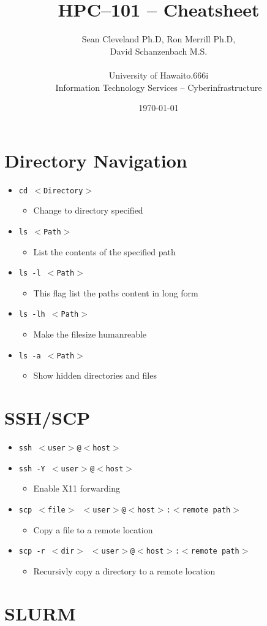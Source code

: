 \documentclass[11pt,twocolumn]{article}
\newcommand{\lft}{$<$}
\newcommand{\rht}{$>$}
\newcommand{\pth}[1]{{\lft}#1{\rht}}
\newlength{\okinalen}
\newcommand{\okina}{\hbox to.666\okinalen{\hss`\hss}}
\newcommand{\hawaii}{Hawai{\okina}i}
\newcommand{\ci}{Cyberinfrastructure}
\newcommand{\desc}[1]{\small \begin{itemize}\item[]#1\end{itemize}}
\begin{document}
\setlength{\droptitle}{-10em}
\title{HPC--101 -- Cheatsheet \vspace{-2ex}}
\date{\today}
\author{Sean Cleveland Ph.D, Ron Merrill Ph.D,\\David Schanzenbach M.S.\\~\\University of {\hawaii}\\Information Technology Services -- {\ci}}
\maketitle
\section{Directory Navigation}
\begin{itemize}
\item[] \texttt{cd {\pth{Directory}}}\desc{Change to directory specified}
\item[] \texttt{ls {\pth{Path}}}\desc{List the contents of the specified path}
\item[] \texttt{ls -l {\pth{Path}}}\desc{This flag list the paths content in long form}
\item[] \texttt{ls -lh {\pth{Path}}}\desc{Make the filesize humanreable}
\item[] \texttt{ls -a {\pth{Path}}}\desc{Show hidden directories and files}
\end{itemize}

\section{SSH/SCP}
\begin{itemize}
\item[] \texttt{ssh {\lft}user{\rht}@{\lft}host{\rht}}
\item[] \texttt{ssh -Y {\lft}user{\rht}@{\lft}host{\rht}}\desc{Enable X11 forwarding}
\item[] \texttt{scp~{\lft}file{\rht}~{\lft}user{\rht}@{\lft}host{\rht}:{\lft}remote~path{\rht}}\desc{Copy a file to a remote location}
\item[] \texttt{scp~-r~{\lft}dir{\rht}~{\lft}user{\rht}@{\lft}host{\rht}:{\lft}remote~path{\rht}}\desc{Recursivly copy a directory to a remote location}
\end{itemize}

\section{SLURM}
\end{document}
